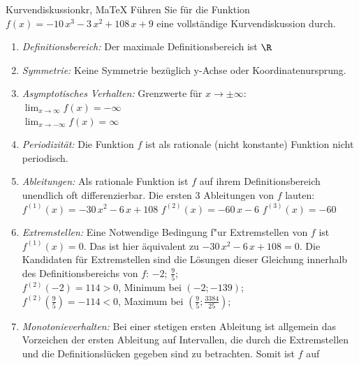  \providecommand{\MoIl}{(} 
 \providecommand{\MoIr}{)}
 \providecommand{\MIntvlSep}{;} 
 \providecommand{\MElSetSep}{;} 
 \begin{MAufgabe}{Kurvendiskussion}{kr, MaTeX}
 F\"uhren Sie f\"ur die Funktion $f(x)= - 10\, x^3 - 3\, x^2 + 108\, x + 9$ eine vollst\"andige Kurvendiskussion durch.\\ 
 \ifLsg\Loesung
 \begin{enumerate}
 \item \emph{Definitionsbereich:} 
 Der maximale Definitionsbereich ist $\R$\item \emph{Symmetrie:} 
 Keine Symmetrie bez\"uglich y-Achse oder Koordinatenursprung.\item \emph{Asymptotisches Verhalten:} 
 Grenzwerte f\"ur $x\rightarrow \pm \infty$: \\ 
 $\lim_{x\rightarrow \infty} f(x)=- \infty$ \\ 
 $\lim_{x\rightarrow -\infty} f(x)=\infty$ \\ 
 \item \emph{Periodizit\"at:} 
 Die Funktion $f$ ist als rationale (nicht konstante) Funktion nicht periodisch.\item \emph{Ableitungen:} 
 Als rationale Funktion ist $f$ auf ihrem Definitionsbereich unendlich oft differenzierbar. 
 Die ersten 3 Ableitungen von $f$ lauten: \\ 
 $f^{(1)}(x)= - 30\, x^2 - 6\, x + 108$\newline 
  $f^{(2)}(x)= - 60\, x - 6$\newline 
  $f^{(3)}(x)=-60$\newline 
  \item \emph{Extremstellen:} 
 Eine Notwendige Bedingung f"ur Extremstellen von $f$ ist $f^{(1)}(x)=0$. 
 Das ist hier \"aquivalent zu $ - 30\, x^2 - 6\, x + 108=0$. 
 Die Kandidaten f\"ur Extremstellen sind die L\"osungen dieser Gleichung innerhalb des Definitionsbereichs von $f$: $-2$; $\frac{9}{5}$; \\ 
 $f^{(2)}(-2)=114$$>0$, Minimum bei $(-2;-139)$; \\ 
 $f^{(2)}(\frac{9}{5})=-114$$<0$, Maximum bei $(\frac{9}{5};\frac{3384}{25})$; \\ 
 \item \emph{Monotonieverhalten:} 
 Bei einer stetigen ersten Ableitung ist allgemein das Vorzeichen der ersten Ableitung auf Intervallen, die durch die Extremstellen und die Definitionsl\"ucken gegeben sind zu betrachten. Somit ist $f$ auf \\ 

\end{enumerate}
\end{MAufgabe}
